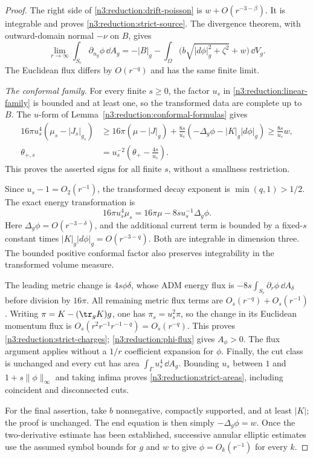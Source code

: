 \begin{proof}
The right side of \eqref{n3:reduction:drift-poisson} is
$w+O(r^{-3-\beta})$.  It is integrable and proves
\eqref{n3:reduction:strict-source}.  The divergence theorem, with
outward-domain normal $-\nu$ on $B$, gives
\begin{equation}
 \label{n3:reduction:phi-flux}
 \lim_{r\to\infty}\int_{S_r}\partial_{n_g}\phi\,\dd A_g
 =-|B|_g-\int_{\Omega}
       \bigl(b\sqrt{|d\phi|_g^2+\zeta^2}+w\bigr)\,\dd V_g.
\end{equation}
The Euclidean flux differs by $O(r^{-q})$ and has the same finite limit.

\emph{The conformal family.} For every finite $s\ge0$, the factor $u_s$ in
\eqref{n3:reduction:linear-family} is bounded and at least one,
so the transformed data are complete up to $B$.
The $u$-form of Lemma~\ref{n3:reduction:conformal-formulas} gives
\begin{align*}
 16\pi u_s^4(\mu_s-|J_s|_{g_s})
 &\ge16\pi(\mu-|J|_g)
        +\frac{8s}{u_s}(-\Delta_g\phi-|K|_g|d\phi|_g)
 \ge \frac{8s}{u_s}w,\\
 \theta_{+,s}
 &=u_s^{-2}\left(\theta_+-\frac{4s}{u_s}\right).
\end{align*}
This proves the asserted signs for all finite $s$, without a smallness
restriction.

Since $u_s-1=O_2(r^{-1})$, the transformed decay exponent is
$\min(q,1)>1/2$.  The exact energy transformation is
\[
 16\pi u_s^4\mu_s=16\pi\mu-8s u_s^{-1}\Delta_g\phi.
\]
Here $\Delta_g\phi=O(r^{-3-\delta})$, and the additional current term
is bounded by a fixed-$s$ constant times
$|K|_g|d\phi|_g=O(r^{-3-q})$.  Both are integrable in dimension three.
The bounded positive conformal factor also preserves integrability in
the transformed volume measure.

The leading metric change is $4s\phi\delta$, whose ADM energy flux
is $-8s\int_{S_r}\partial_r\phi\,\dd A_\delta$ before division by
$16\pi$.  All remaining metric flux terms are
$O_s(r^{-q})+O_s(r^{-1})$.  Writing $\pi=K-(\tr_gK)g$, one has
$\pi_s=u_s^2\pi$, so the change in its Euclidean momentum flux is
$O_s(r^2r^{-1}r^{-1-q})=O_s(r^{-q})$.
This proves \eqref{n3:reduction:strict-charges};
\eqref{n3:reduction:phi-flux} gives $A_\phi>0$.
The flux argument applies without a $1/r$ coefficient expansion for $\phi$.
Finally, the cut class is unchanged and every cut has area
$\int_\Gamma u_s^4\,\dd A_g$.  Bounding $u_s$ between $1$ and
$1+s\|\phi\|_\infty$ and taking infima proves
\eqref{n3:reduction:strict-areas}, including coincident and
disconnected cuts.

For the final assertion, take $b$ nonnegative, compactly supported, and
at least $|K|$; the proof is unchanged.  The end equation is then simply
$-\Delta_g\phi=w$.  Once the two-derivative estimate has been established,
successive annular elliptic estimates use the assumed symbol bounds for
$g$ and $w$ to give $\phi=O_k(r^{-1})$ for every $k$.
\end{proof}

